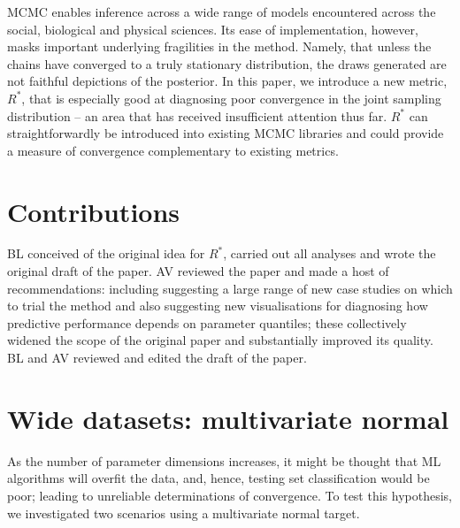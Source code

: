 \documentclass{article}
\newcommand{\beginsupplement}{%
	\setcounter{table}{0}
	\renewcommand{\thetable}{S\arabic{table}}%
	\setcounter{figure}{0}
	\renewcommand{\thefigure}{S\arabic{figure}}%
	\setcounter{section}{0}
	\renewcommand{\thesection}{S\arabic{section}}%
}
\begin{document}
MCMC enables inference across a wide range of models encountered across the social, biological and physical sciences. Its ease of implementation, however, masks important underlying fragilities in the method. Namely, that unless the chains have converged to a truly stationary distribution, the draws generated are not faithful depictions of the posterior. In this paper, we introduce a new metric, $R^*$, that is especially good at diagnosing poor convergence in the joint sampling distribution -- an area that has received insufficient attention thus far. $R^*$ can straightforwardly be introduced into existing MCMC libraries and could provide a measure of convergence complementary to existing metrics.


\section{Contributions}
BL conceived of the original idea for $R^*$, carried out all analyses and wrote the original draft of the paper. AV reviewed the paper and made a host of recommendations: including suggesting a large range of new case studies on which to trial the method and also suggesting new visualisations for diagnosing how predictive performance depends on parameter quantiles; these collectively widened the scope of the original paper and substantially improved its quality. BL and AV reviewed and edited the draft of the paper.


 

\beginsupplement

\section{Wide datasets: multivariate normal}\label{sec:wide}
As the number of parameter dimensions increases, it might be thought that ML algorithms will overfit the data, and, hence, testing set classification would be poor; leading to unreliable determinations of convergence. To test this hypothesis, we investigated two scenarios using a multivariate normal target.
\end{document}

